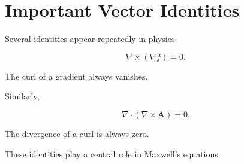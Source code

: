 \section{Important Vector Identities}

Several identities appear repeatedly in physics.

\[
\boxed{
	\nabla\times(\nabla f)=0.
}
\]

The curl of a gradient always vanishes.

Similarly,

\[
\boxed{
	\nabla\cdot(\nabla\times\mathbf A)=0.
}
\]

The divergence of a curl is always zero.

These identities play a central role in Maxwell's equations.

